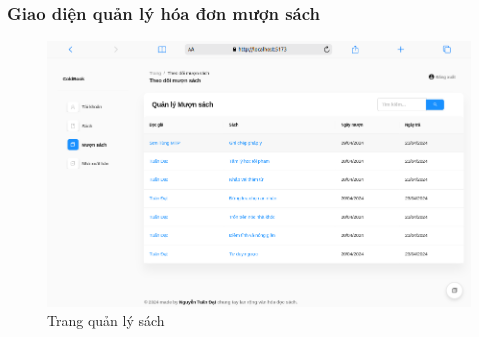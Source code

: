 \subsubsection{Giao diện quản lý hóa đơn mượn sách}
\begin{figure}[H]
  \centering
   \includegraphics[width=1\textwidth]{report/images/admin/muonsach.png}
  \caption{Trang quản lý sách}
\end{figure}

